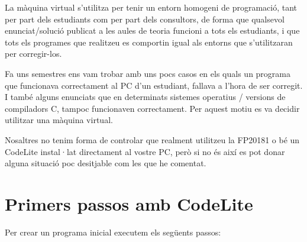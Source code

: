 \documentclass[]{book}
\begin{document}
La màquina virtual s'utilitza per tenir un entorn homogeni de
programació, tant per part dels estudiants com per part dels consultors,
de forma que qualsevol enunciat/solució publicat a les aules de teoria
funcioni a tots els estudiants, i que tots els programes que realitzeu
es comportin igual als entorns que s'utilitzaran per corregir-los.

Fa uns semestres ens vam trobar amb uns pocs casos en els quals un
programa que funcionava correctament al PC d'un estudiant, fallava a
l'hora de ser corregit. I també alguns enunciats que en determinats
sistemes operatius / versions de compiladors C, tampoc funcionaven
correctament. Per aquest motiu es va decidir utilitzar una màquina
virtual.

Nosaltres no tenim forma de controlar que realment utilitzeu la FP20181
o bé un CodeLite instal·lat directament al vostre PC, però si no és així
es pot donar alguna situació poc desitjable com les que he comentat.

\section{Primers passos amb CodeLite}\label{primers-passos-amb-codelite}

Per crear un programa inicial executem els següents passos:
\end{document}
